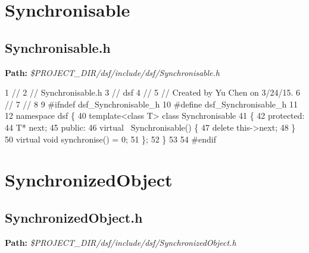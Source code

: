  \hypertarget{_dual_state_framework_DualStateFrameworkSynchronisable}{}\section{Synchronisable}\label{_dual_state_framework_DualStateFrameworkSynchronisable}
\hypertarget{_dual_state_framework_DualStateFrameworkSynchronisable_h}{}\subsection{Synchronisable.\+h}\label{_dual_state_framework_DualStateFrameworkSynchronisable_h}
{\bfseries Path\+:} {\itshape \$\+P\+R\+O\+J\+E\+C\+T\+\_\+\+D\+I\+R/dsf/include/dsf/\+Synchronisable.h} 
\begin{DoxyCodeInclude}
1 \textcolor{comment}{//}
2 \textcolor{comment}{//  Synchronisable.h}
3 \textcolor{comment}{//  dsf}
4 \textcolor{comment}{//}
5 \textcolor{comment}{//  Created by Yu Chen on 3/24/15.}
6 \textcolor{comment}{//}
7 \textcolor{comment}{//}
8 
9 \textcolor{preprocessor}{#ifndef dsf\_Synchronisable\_h}
10 \textcolor{preprocessor}{#define dsf\_Synchronisable\_h}
11 
12 \textcolor{keyword}{namespace }dsf \{
40     \textcolor{keyword}{template}<\textcolor{keyword}{class} T> \textcolor{keyword}{class }Synchronisable
41     \{
42     \textcolor{keyword}{protected}:
44         T* next;
45     \textcolor{keyword}{public}:
46         \textcolor{keyword}{virtual} ~Synchronisable() \{
47             \textcolor{keyword}{delete} this->next;
48         \}
50         \textcolor{keyword}{virtual} \textcolor{keywordtype}{void} synchronise() = 0;
51     \};
52 \}
53 
54 \textcolor{preprocessor}{#endif}
\end{DoxyCodeInclude}
 \hypertarget{_dual_state_framework_DualStateFrameworkSynchronizedObject}{}\section{Synchronized\+Object}\label{_dual_state_framework_DualStateFrameworkSynchronizedObject}
\hypertarget{_dual_state_framework_DualStateFrameworkSynchronizedObject_h}{}\subsection{Synchronized\+Object.\+h}\label{_dual_state_framework_DualStateFrameworkSynchronizedObject_h}
{\bfseries Path\+:} {\itshape \$\+P\+R\+O\+J\+E\+C\+T\+\_\+\+D\+I\+R/dsf/include/dsf/\+Synchronized\+Object.h} 
